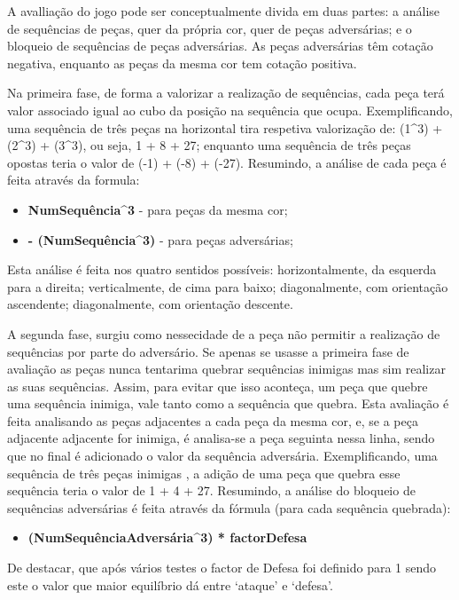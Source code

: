 \documentclass[a4paper]{article}
\begin{document}
A avalliação do jogo pode ser conceptualmente divida em duas partes: a análise de sequências de peças, quer da própria cor, quer de peças adversárias; e o bloqueio de sequências de peças adversárias. As peças adversárias têm cotação negativa, enquanto as peças da mesma cor tem cotação positiva.

Na primeira fase, de forma a valorizar a realização de sequências, cada peça terá valor associado igual ao cubo da posição na sequência que ocupa. Exemplificando, uma sequência de três peças na horizontal tira respetiva valorização de: (1\textasciicircum3) + (2\textasciicircum3) + (3\textasciicircum3), ou seja, 1 + 8 + 27; enquanto uma sequência de três peças opostas teria o valor de (-1) + (-8) + (-27). Resumindo, a análise de cada peça é feita através da formula:
\begin{itemize}
	\item \textbf{ NumSequência\textasciicircum3} - para peças da mesma cor;
	\item \textbf{- (NumSequência\textasciicircum3)} - para peças adversárias;
\end{itemize}
Esta análise é feita nos quatro sentidos possíveis: horizontalmente, da esquerda para a direita; verticalmente, de cima para baixo; diagonalmente, com orientação ascendente; diagonalmente, com orientação descente.

A segunda fase, surgiu como nessecidade de a peça não permitir a realização de sequências por parte do adversário. Se apenas se usasse a primeira fase de avaliação as peças nunca tentarima quebrar sequências inimigas mas sim realizar as suas sequências. Assim, para evitar que isso aconteça, um peça que quebre uma sequência inimiga, vale tanto como a sequência que quebra. Esta avaliação é feita analisando as peças adjacentes a cada peça da mesma cor, e, se a peça adjacente adjacente for inimiga, é analisa-se a peça seguinta nessa linha, sendo que no final é adicionado o valor da sequência adversária. Exemplificando, uma sequência de três peças inimigas , a adição de uma peça que quebra esse sequência teria o valor de 1 + 4 + 27. Resumindo, a análise do bloqueio de sequências adversárias é feita através da fórmula (para cada sequência quebrada):
\begin{itemize}
	\item \textbf{(NumSequênciaAdversária\textasciicircum3) * factorDefesa}
\end{itemize}
De destacar, que após vários testes o factor de Defesa foi definido para 1 sendo este o valor que maior equilíbrio dá entre `ataque' e `defesa'.
\end{document}
